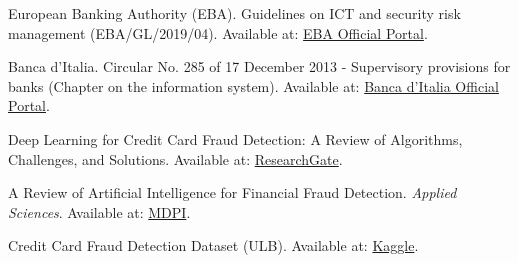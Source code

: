 \documentclass[12pt]{report}
\begin{document}
\begin{thebibliography}{99}
European Banking Authority (EBA). Guidelines on ICT and security risk management (EBA/GL/2019/04). Available at: \href{https://www.eba.europa.eu/sites/default/files/document_library/Publications/Guidelines/2020/GLs%20on%20ICT%20and%20security%20risk%20management/Updated%20Translations/880818/Final%20draft%20Guidelines%20on%20ICT%20and%20security%20risk%20management_COR_IT.pdf}{EBA Official Portal}.

Banca d'Italia. Circular No. 285 of 17 December 2013 - Supervisory provisions for banks (Chapter on the information system). Available at: \href{https://www.bancaditalia.it/compiti/vigilanza/normativa/archivio-norme/circolari/c285/index.html}{Banca d'Italia Official Portal}.

Deep Learning for Credit Card Fraud Detection: A Review of Algorithms, Challenges, and Solutions. Available at: \href{https://www.google.com/search?q=https://www.researchgate.org/publication/382187222_Deep_Learning_for_Credit_Card_Fraud_Detection_A_Review_of_Algorithms_Challenges_and_Solutions}{ResearchGate}.

A Review of Artificial Intelligence for Financial Fraud Detection. \textit{Applied Sciences}. Available at: \href{https://www.mdpi.com/2076-3417/16/4/1931}{MDPI}.

Credit Card Fraud Detection Dataset (ULB). Available at: \href{https://www.kaggle.com/datasets/joebeachcapital/credit-card-fraud}{Kaggle}.

\end{thebibliography}
\end{document}
